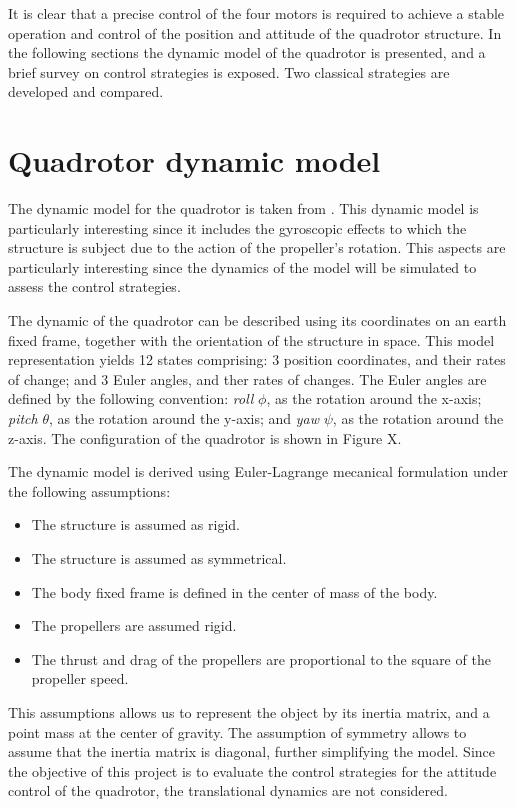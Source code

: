 \documentclass[12pt]{article}
\begin{document}
It is clear that a precise control of the four motors is required to achieve a stable operation and control of the position and attitude of the quadrotor structure. In the following sections the dynamic model of the quadrotor is presented, and a brief survey on control strategies is exposed. Two classical strategies are developed and compared.

\section{Quadrotor dynamic model}
\label{sec:dynamics}
The dynamic model for the quadrotor is taken from \cite{Boua04}. This dynamic model is particularly interesting since it includes the gyroscopic effects to which the structure is subject due to the action of the propeller's rotation. This aspects are particularly interesting since the dynamics of the model will be simulated to assess the control strategies.

The dynamic of the quadrotor can be described using its coordinates on an earth fixed frame, together with the orientation of the structure in space. This model representation yields 12 states comprising: 3 position coordinates, and their rates of change; and 3 Euler angles, and ther rates of changes. The Euler angles are defined by the following convention: \emph{roll} $\phi$, as the rotation around the x-axis; \emph{pitch} $\theta$, as the rotation around the y-axis; and \emph{yaw} $\psi$, as the rotation around the z-axis. The configuration of the quadrotor is shown in Figure X.

The dynamic model is derived using Euler-Lagrange mecanical formulation under the following assumptions:

\begin{itemize}
\item The structure is assumed as rigid.
\item The structure is assumed as symmetrical.
\item The body fixed frame is defined in the center of mass of the body.
\item The propellers are assumed rigid.
\item The thrust and drag of the propellers are proportional to the square of the propeller speed.
\end{itemize}

This assumptions allows us to represent the object by its inertia matrix, and a point mass at the center of gravity. The assumption of symmetry allows to assume that the inertia matrix is diagonal, further simplifying the model. Since the objective of this project is to evaluate the control strategies for the attitude control of the quadrotor, the translational dynamics are not considered. 
\end{document}
